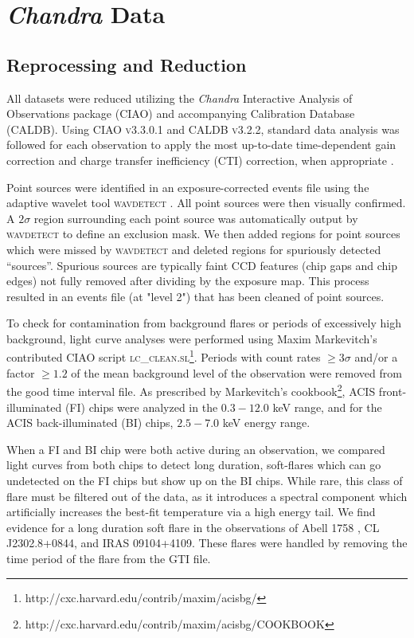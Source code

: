 \documentclass[12pt,preprint]{aastex}
\begin{document}
\section{{\it Chandra} Data}\label{sec:data}

\subsection{Reprocessing and Reduction}\label{sec:reprocessing}

All datasets were reduced utilizing the {\it Chandra} Interactive Analysis of
Observations package ({\textsc{CIAO}}) and accompanying Calibration
Database ({\textsc{CALDB}}). Using {\textsc{CIAO v3.3.0.1}} and
{\textsc{CALDB v3.2.2}}, standard data analysis was followed for each
observation to apply the most up-to-date time-dependent gain
correction and charge transfer inefficiency (CTI) correction, when
appropriate \citep{2000ApJ...534L.139T}.

Point sources were identified in an exposure-corrected events file
using the adaptive wavelet tool {\textsc{wavdetect}}
\citep{2002ApJS..138..185F}. All point sources were then visually
confirmed. A $2\sigma$ region surrounding each point source was
automatically output by {\textsc{wavdetect}} to define an exclusion
mask. We then added regions for point sources which were missed by
{\textsc{wavdetect}} and deleted regions for spuriously detected
``sources''. Spurious sources are typically faint CCD features (chip
gaps and chip edges) not fully removed after dividing by the exposure
map. This process resulted in an events file (at "level 2") that has
been cleaned of point sources.

To check for contamination from background flares or periods of
excessively high background, light curve analyses were performed using
Maxim Markevitch's contributed {\textsc{CIAO}} script
{\textsc{lc\_clean.sl}}\footnote{http://cxc.harvard.edu/contrib/maxim/acisbg/}.
Periods with count rates $\geq 3\sigma$ and/or a factor $\geq 1.2$ of
the mean background level of the observation were removed from the
good time interval file. As prescribed by Markevitch's
cookbook\footnote{http://cxc.harvard.edu/contrib/maxim/acisbg/COOKBOOK},
ACIS front-illuminated (FI) chips were analyzed in the $0.3-12.0$ keV
range, and for the ACIS back-illuminated (BI) chips, $2.5-7.0$ keV
energy range.

When a FI and BI chip were both active during an observation, we
compared light curves from both chips to detect long duration,
soft-flares which can go undetected on the FI chips but show up on the
BI chips. While rare, this class of flare must be filtered out of the
data, as it introduces a spectral component which artificially
increases the best-fit temperature via a high energy tail. We find
evidence for a long duration soft flare in the observations of Abell
1758 \citep{2004ApJ...613..831D}, CL J2302.8+0844, and IRAS
09104+4109. These flares were handled by removing the time period of
the flare from the GTI file.
\end{document}
